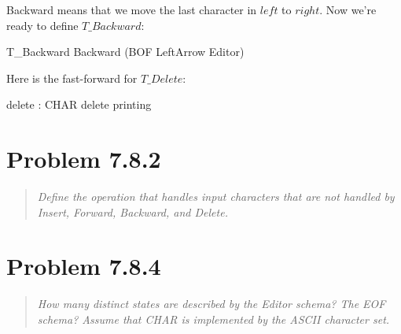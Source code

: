 \documentclass[11pt]{article}
\begin{document}
Backward means that we move the last character in $left$ to $right$.  Now we're ready to define
$T\_Backward$:

\begin{zed}
  T\_Backward  Backward \lor (BOF \land LeftArrow \land \Xi Editor)
\end{zed}

Here is the fast-forward for $T\_Delete$:

\begin{axdef}{}
  delete : CHAR
  \where
  delete \notin printing
\end{axdef}

\begin{schema}{}
  
\end{schema}

\section{Problem 7.8.2}

\begin{quote}
  \textit{Define the operation that handles input characters that are not handled by Insert,
    Forward, Backward, and Delete.}
\end{quote}


\section{Problem 7.8.4}

\begin{quote}
  \textit{How many distinct states are described by the Editor schema? The EOF schema? Assume that
    CHAR is implemented by the ASCII character set.}
\end{quote}
\end{document}
